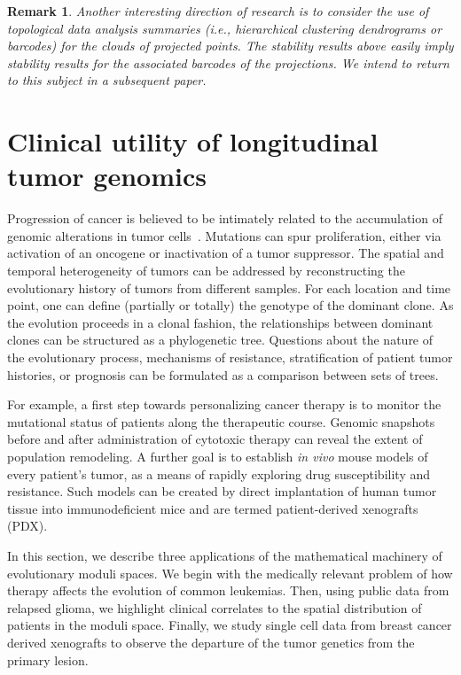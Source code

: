 \documentclass[a4paper,11pt]{article}
\newtheorem{remark}[theorem]{Remark}
\begin{document}
\begin{remark}
Another interesting direction of research is to consider the use of topological data analysis summaries (i.e., hierarchical clustering dendrograms or barcodes) for the clouds of projected points.
The stability results above easily imply stability results for the associated barcodes of the projections.
We intend to return to this subject in a subsequent paper.
\end{remark}

\section{Clinical utility of longitudinal tumor genomics}\label{sec:cancer}

Progression of cancer is believed to be intimately related to the accumulation of genomic alterations in tumor cells~\cite{nowell1976clonal}.
Mutations can spur proliferation, either via activation of an oncogene or inactivation of a tumor suppressor.
The spatial and temporal heterogeneity of tumors can be addressed by reconstructing the evolutionary history of tumors from different samples.
For each location and time point, one can define (partially or totally) the genotype of the dominant clone.
As the evolution proceeds in a clonal fashion, the relationships between dominant clones can be structured as a phylogenetic tree.
Questions about the nature of the evolutionary process, mechanisms of resistance, stratification of patient tumor histories, or prognosis can be formulated as a comparison between sets of trees.

For example, a first step towards personalizing cancer therapy is to monitor the mutational status of patients along the therapeutic course.
Genomic snapshots before and after administration of cytotoxic therapy can reveal the extent of population remodeling.
A further goal is to establish \textit{in vivo} mouse models of every patient's tumor, as a means of rapidly exploring drug susceptibility and resistance.
Such models can be created by direct implantation of human tumor tissue into immunodeficient mice and are termed patient-derived xenografts (PDX).

In this section, we describe three applications of the mathematical machinery of evolutionary moduli spaces.
We begin with the medically relevant problem of how therapy affects the evolution of common leukemias.
Then, using public data from relapsed glioma, we highlight clinical correlates to the spatial distribution of patients in the moduli space.
Finally, we study single cell data from breast cancer derived xenografts to observe the departure of the tumor genetics from the primary lesion.
\end{document}
